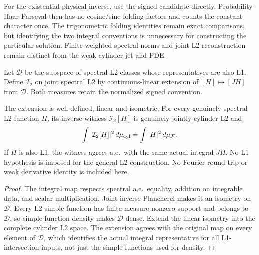 \begin{remark}
For the existential physical inverse, use the signed candidate directly.
Probability-Haar Parseval then has no cosine/sine folding factors and counts the
constant character once. The trigonometric folding identities remain exact
comparisons, but identifying the two integral conventions is unnecessary for
constructing the particular solution. Finite weighted spectral norms and joint
L2 reconstruction remain distinct from the weak cylinder jet and PDE.
\end{remark}

\begin{definition}
\label{def:cylinder-l2-inverse}
\leanok
Let $\mathcal D$ be the subspace of spectral L2 classes whose representatives
are also L1. Define $\mathcal I_2$ on joint spectral L2 by continuous-linear
extension of $[H]\mapsto[JH]$ from $\mathcal D$.
Both measures retain the normalized signed convention.
\end{definition}

\begin{lemma}
\label{lem:cylinder-l2-inverse}
\leanok
The extension is well-defined, linear and isometric. For every genuinely
spectral L2 function $H$, its inverse witness $\mathcal I_2[H]$ is genuinely
jointly cylinder L2 and
\[
 \int|\mathcal I_2[H]|^2\,d\mu_{\rm cyl}
   =\int|H|^2\,d\mu_{\mathcal F}.
\]
If $H$ is also L1, the witness agrees a.e.\ with the same actual integral $JH$.
No L1 hypothesis is imposed for the general L2 construction.
No Fourier round-trip or weak derivative identity is included here.
\end{lemma}

\begin{proof}
\leanok
The integral map respects spectral a.e.\ equality, addition on integrable data,
and scalar multiplication. Joint inverse Plancherel makes it an isometry
on $\mathcal D$. Every L2 simple function has finite-measure nonzero support and
belongs to $\mathcal D$, so simple-function density makes $\mathcal D$ dense.
Extend the linear isometry into the complete cylinder L2 space.
The extension agrees with the original map on every element of $\mathcal D$,
which identifies the actual integral representative for all L1-intersection
inputs, not just the simple functions used for density.
\end{proof}

